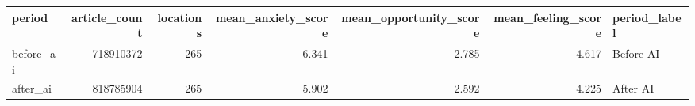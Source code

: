\begin{tabular}{lrrrrrl}
\toprule
period & article\_count & locations & mean\_anxiety\_score & mean\_opportunity\_score & mean\_feeling\_score & period\_label \\
\midrule
before\_ai & 718910372 & 265 & 6.341 & 2.785 & 4.617 & Before AI \\
after\_ai & 818785904 & 265 & 5.902 & 2.592 & 4.225 & After AI \\
\bottomrule
\end{tabular}
